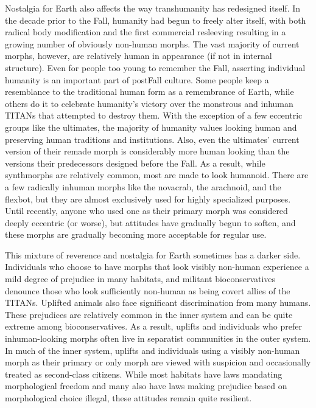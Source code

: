 Nostalgia for Earth also affects the way transhumanity has redesigned itself. In the decade prior to the Fall, humanity had begun to freely alter itself, with both radical body modification and the first commercial resleeving resulting in a growing number of obviously non-human morphs. The vast majority of current morphs, however, are relatively human in appearance (if not in internal structure). Even for people too young to remember the Fall, asserting individual humanity is an important part of postFall culture. Some people keep a resemblance to the traditional human form as a remembrance of Earth, while others do it to celebrate humanity's victory over the monstrous and inhuman TITANs that attempted to destroy them. With the exception of a few eccentric groups like the ultimates, the majority of humanity values looking human and preserving human traditions and institutions. Also, even the ultimates' current version of their remade morph is considerably more human looking than the versions their predecessors designed before the Fall. As a result, while synthmorphs are relatively common, most are made to look humanoid. There are a few radically inhuman morphs like the novacrab, the arachnoid, and the flexbot, but they are almost exclusively used for highly specialized purposes. Until recently, anyone who used one as their primary morph was considered deeply eccentric (or worse), but attitudes have gradually begun to soften, and these morphs are gradually becoming more acceptable for regular use. 

This mixture of reverence and nostalgia for Earth sometimes has a darker side. Individuals who choose to have morphs that look visibly non-human experience a mild degree of prejudice in many habitats, and militant bioconservatives denounce those who look sufficiently non-human as being covert allies of the TITANs. Uplifted animals also face significant discrimination from many humans. These prejudices are relatively common in the inner system and can be quite extreme among bioconservatives. As a result, uplifts and individuals who prefer inhuman-looking morphs often live in separatist communities in the outer system. In much of the inner system, uplifts and individuals using a visibly non-human morph as their primary or only morph are viewed with suspicion and occasionally treated as second-class citizens. While most habitats have laws mandating morphological freedom and many also have laws making prejudice based on morphological choice illegal, these attitudes remain quite resilient. 

